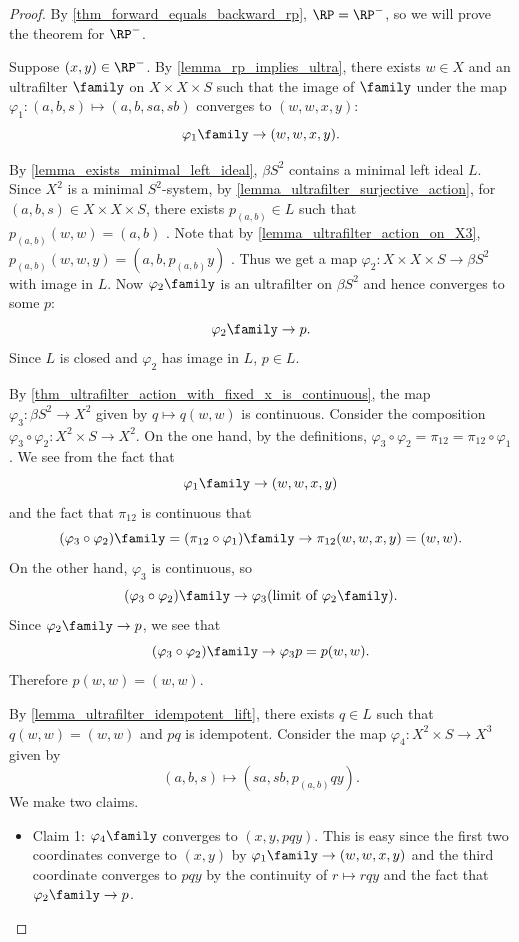 \begin{proof}
    By \cref{thm_forward_equals_backward_rp}, $\RP = \RP^-$, so we will prove the theorem for $\RP^-$.
    
    Suppose $(x,y) \in \RP^-$. By \cref{lemma_rp_implies_ultra}, there exists $w \in X$ and an ultrafilter $\family$ on $X \times X \times S$ such that the image of $\family$ under the map $\varphi_1: (a,b,s) \mapsto (a,b,sa,sb)$  converges to $(w,w,x,y)$:
    \[\varphi_1 \family \to (w,w,x,y).\]

    By \cref{lemma_exists_minimal_left_ideal}, $\beta S^2$ contains a minimal left ideal $L$.  Since $X^2$ is a minimal $S^2$-system, by \cref{lemma_ultrafilter_surjective_action}, for $(a,b,s) \in X \times X \times S$, there exists $p_{(a,b)} \in L$ such that $p_{(a,b)}(w,w) = (a,b)$ .  Note that by \cref{lemma_ultrafilter_action_on_X3}, $p_{(a,b)} (w,w,y) = (a, b, p_{(a,b)} y)$ . Thus we get a map $\varphi_2: X \times X \times S \to \beta S^2$ with image in $L$. Now $\varphi_2 \family$ is an ultrafilter on $\beta S^2$ and hence converges to some $p$:
    \[\varphi_2 \family \to p.\]
    Since $L$ is closed and $\varphi_2$ has image in $L$, $p \in L$.
    
    By \cref{thm_ultrafilter_action_with_fixed_x_is_continuous}, the map $\varphi_3: \beta S^2 \to X^2$ given by $q \mapsto q(w,w)$  is continuous. Consider the composition $\varphi_3 \circ \varphi_2: X^2 \times S \to X^2$.  On the one hand, by the definitions, $\varphi_3 \circ \varphi_2 = \pi_{12} = \pi_{12} \circ \varphi_1$. We see from the fact that
    \[\varphi_1 \family \to (w,w,x,y)\]
    and the fact that $\pi_{12}$ is continuous that
    \[(\varphi_3 \circ \varphi_2) \family = (\pi_{12} \circ \varphi_1) \family \to \pi_{12} (w,w,x,y) = (w,w).\]
    On the other hand, $\varphi_3$ is continuous, so
    \[(\varphi_3 \circ \varphi_2) \family \to \varphi_3 (\text{limit of } \varphi_2 \family).\]
    Since $\varphi_2 \family \to p$, we see that
    \[(\varphi_3 \circ \varphi_2) \family \to \varphi_3 p = p(w,w).\]
    Therefore $p(w,w) = (w,w)$.

    By \cref{lemma_ultrafilter_idempotent_lift}, there exists $q \in L$ such that $q (w,w) = (w,w)$ and $pq$ is idempotent. Consider the map $\varphi_4: X^2 \times S \to X^3$ given by
    \[(a,b,s) \mapsto (sa,sb,p_{(a,b)}qy).\]
    We make two claims.
    \begin{itemize}
        \item Claim 1: $\varphi_4 \family$ converges to $(x,y,pqy)$.  This is easy since the first two coordinates converge to $(x,y)$ by $\varphi_1 \family \to (w,w,x,y)$ and the third coordinate converges to $pqy$ by the continuity of $r \mapsto rqy$ and the fact that $\varphi_2 \family \to p$.
        

\end{itemize}
\end{proof}
